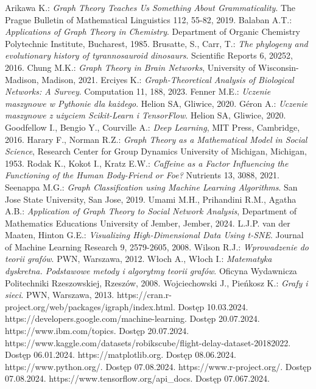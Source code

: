 
\begin{thebibliography}{4}
     Arikawa K.: \textit{Graph Theory Teaches Us Something About Grammaticality}. The Prague Bulletin of Mathematical Linguistics 112, 55-82, 2019.
     Balaban A.T.: \textit{Applications of Graph Theory in Chemistry}. Department of Organic Chemistry Polytechnic Institute, Bucharest, 1985.
     Brusatte, S., Carr, T.: \textit{The phylogeny and evolutionary history of tyrannosauroid dinosaurs}. Scientific Reports 6, 20252, 2016.
     Chung M.K.: \textit{Graph Theory in Brain Networks}, University of Wisconsin-Madison, Madison, 2021.
     Erciyes K.: \textit{Graph-Theoretical Analysis of Biological Networks: A Survey}. Computation 11, 188, 2023.
     Fenner M.E.: \textit{Uczenie maszynowe w Pythonie dla każdego}. Helion SA, Gliwice, 2020.
     Géron A.: \textit{Uczenie maszynowe z użyciem Scikit-Learn i TensorFlow}. Helion SA, Gliwice, 2020.
     Goodfellow I., Bengio Y., Courville A.: \textit{Deep Learning}, MIT Press, Cambridge, 2016.
     Harary F., Norman R.Z.: \textit{Graph Theory as a Mathematical Model in Social Science}, Research Center for Group Dynamics University of Michigan, Michigan, 1953.
     Rodak K., Kokot I., Kratz E.W.: \textit{Caffeine as a Factor Influencing the Functioning of the Human Body-Friend or Foe?} Nutrients 13, 3088, 2021.
     Seenappa M.G.: \textit{Graph Classification using Machine Learning Algorithms}. San Jose State University, San Jose, 2019.
     Umami M.H., Prihandini R.M., Agatha A.B.: \textit{Application of Graph Theory to Social Network Analysis}, Department of Mathematics Educations University of Jember, Jember, 2024.
     L.J.P. van der Maaten, Hinton G.E.: \textit{Visualizing High-Dimensional Data Using t-SNE}. Journal of Machine Learning Research 9, 2579-2605, 2008.
     Wilson R.J.: \textit{Wprowadzenie do teorii grafów}. PWN, Warszawa, 2012.
     Włoch A., Włoch I.: \textit{Matematyka dyskretna. Podstawowe metody i algorytmy teorii grafów}. Oficyna Wydawnicza Politechniki Rzeszowskiej, Rzeszów, 2008.
     Wojciechowski J., Pieńkosz K.: \textit{Grafy i sieci}. PWN, Warszawa, 2013.
     https://cran.r-project.org/web/packages/igraph/index.html. Dostęp 10.03.2024.
     https://developers.google.com/machine-learning. Dostęp 20.07.2024.
     https://www.ibm.com/topics. Dostęp 20.07.2024.
     https://www.kaggle.com/datasets/robikscube/flight-delay-dataset-20182022. Dostęp 06.01.2024.
     https://matplotlib.org. Dostęp 08.06.2024.
     https://www.python.org/. Dostęp 07.08.2024.
     https://www.r-project.org/. Dostęp 07.08.2024.
     https://www.tensorflow.org/api\_docs. Dostęp 07.067.2024.
\end{thebibliography}